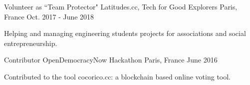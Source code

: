 \begin{cventries}
  \cventry
    {Volunteer as ``Team Protector"}
    {Latitudes.cc, Tech for Good Explorers}
    {Paris, France}
    {Oct. 2017 - June 2018}
    {
      \begin{cvitems}
        \item {Helping and managing engineering students projects for associations and social entrepreneurship.}
      \end{cvitems}
    }
  \cventry
    {Contributor}
    {OpenDemocracyNow Hackathon}
    {Paris, France}
    {June 2016}
    {
      \begin{cvitems}
        \item {Contributed to the tool cocorico.cc: a blockchain based online voting tool.}
      \end{cvitems}
    }
\end{cventries}
